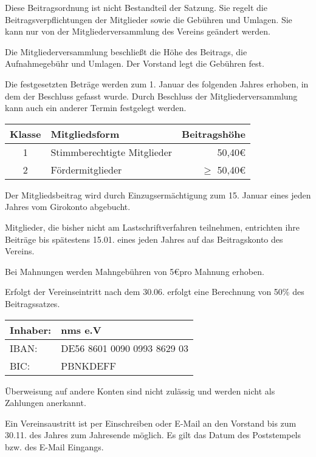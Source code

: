\begin{beitrag}

  Diese Beitragsordnung ist nicht Bestandteil der Satzung. Sie regelt die Beitragsverpflichtungen der Mitglieder sowie die Gebühren und Umlagen. Sie kann nur von der Mitgliederversammlung des Vereins geändert werden.

  Die Mitgliederversammlung beschließt die Höhe des Beitrags, die Aufnahmegebühr und Umlagen. Der Vorstand legt die Gebühren fest.

  Die festgesetzten Beträge werden zum 1. Januar des folgenden Jahres erhoben, in dem der Beschluss gefasst wurde. Durch Beschluss der Mitgliederversammlung kann auch ein anderer Termin festgelegt werden.


  \begin{center}
    \begin{tabular}{ |c|l|r| }
      \hline
      Klasse & Mitgliedsform               & Beitragshöhe     \\
      \hline \hline
      1      & Stimmberechtigte Mitglieder & 50,40\euro       \\
      2      & Fördermitglieder            & $\ge$ 50,40\euro \\
      \hline
    \end{tabular}
  \end{center}

  Der Mitgliedsbeitrag wird durch Einzugsermächtigung zum 15. Januar eines jeden Jahres vom Girokonto abgebucht.

  Mitglieder, die bisher nicht am Lastschriftverfahren teilnehmen, entrichten ihre Beiträge bis spätestens 15.01. eines jeden Jahres auf das Beitragskonto des Vereins.

  Bei Mahnungen werden Mahngebühren von 5\euro pro Mahnung erhoben.

  Erfolgt der Vereinseintritt nach dem 30.06. erfolgt eine Berechnung von 50\% des Beitragssatzes.


  \begin{center}
    \begin{tabular}{ |ll| }
      \hline
      Inhaber: & nms e.V                     \\
      \hline
      IBAN:    & DE56 8601 0090 0993 8629 03 \\
      \hline
      BIC:     & PBNKDEFF                    \\
      \hline
    \end{tabular}
  \end{center}

  Überweisung auf andere Konten sind nicht zulässig und werden nicht als Zahlungen anerkannt.

  Ein Vereinsaustritt ist per Einschreiben oder E-Mail an den Vorstand bis zum 30.11. des Jahres zum Jahresende möglich. Es gilt das Datum des Poststempels bzw. des E-Mail Eingangs.

\end{beitrag}

